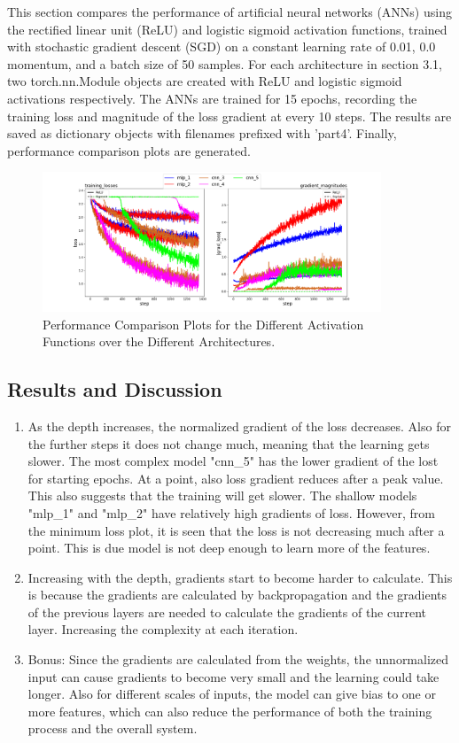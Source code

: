 \documentclass[3p,times,procedia]{elsarticle}
\begin{document}
This section compares the performance of artificial neural networks (ANNs) using the rectified linear unit (ReLU) and logistic sigmoid activation functions, trained with stochastic gradient descent (SGD) on a constant learning rate of 0.01, 0.0 momentum, and a batch size of 50 samples.
For each architecture in section 3.1, two torch.nn.Module objects are created with ReLU and logistic sigmoid activations respectively. The ANNs are trained for 15 epochs, recording the training loss and magnitude of the loss gradient at every 10 steps.
The results are saved as dictionary objects with filenames prefixed with 'part4'.
Finally, performance comparison plots are generated.

\begin{figure}[H]
    \centering
    \includegraphics[width=0.9\textwidth, trim={0 1cm 0 1cm}]{figures/bb.png}
    \caption{Performance Comparison Plots for the Different Activation Functions over the Different Architectures.} 
    \label{fig:act_fun}
\end{figure}

\subsection{\textbf{Results and Discussion}}
\begin{enumerate}
    \item As the depth increases, the normalized gradient of the loss decreases. Also for the further steps it does not change much,
    meaning that the learning gets slower.
    The most complex model "cnn\_5" has the lower gradient of the lost for starting epochs. At a point, also loss gradient reduces after a peak value. This also suggests that the training will get slower.
    The shallow models "mlp\_1" and "mlp\_2" have relatively high gradients of loss. However, from the minimum loss plot, it is seen that the loss is not decreasing much after a point. This is due model is not deep enough to learn more of the features.

    \item Increasing with the depth, gradients start to become harder to calculate. This is because the gradients are calculated by backpropagation and the gradients of the previous layers are needed to calculate the gradients of the current layer. Increasing the complexity at each iteration.
    \item Bonus: Since the gradients are calculated from the weights, the unnormalized input can cause gradients to become very small and the learning could take longer.
    Also for different scales of inputs, the model can give bias to one or more features, which can also reduce the performance of both the training process and the overall system.
\end{enumerate}
\end{document}
